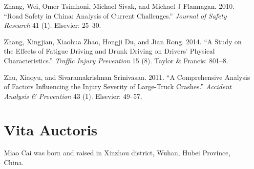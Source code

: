 \documentclass[12pt]{book}
\numberwithin{equation}{chapter}
\begin{document}
\leavevmode\hypertarget{ref-zhang2010road}{}%
Zhang, Wei, Omer Tsimhoni, Michael Sivak, and Michael J Flannagan. 2010. ``Road Safety in China: Analysis of Current Challenges.'' \emph{Journal of Safety Research} 41 (1). Elsevier: 25--30.

\leavevmode\hypertarget{ref-zhang2014study}{}%
Zhang, Xingjian, Xiaohua Zhao, Hongji Du, and Jian Rong. 2014. ``A Study on the Effects of Fatigue Driving and Drunk Driving on Drivers' Physical Characteristics.'' \emph{Traffic Injury Prevention} 15 (8). Taylor \& Francis: 801--8.

\leavevmode\hypertarget{ref-zhu2011comprehensive}{}%
Zhu, Xiaoyu, and Sivaramakrishnan Srinivasan. 2011. ``A Comprehensive Analysis of Factors Influencing the Injury Severity of Large-Truck Crashes.'' \emph{Accident Analysis \& Prevention} 43 (1). Elsevier: 49--57.

\hypertarget{vita-auctoris}{%
\chapter*{Vita Auctoris}\label{vita-auctoris}}

Miao Cai was born and raised in Xinzhou district, Wuhan, Hubei Province, China.







\backmatter
\printindex
\end{document}
